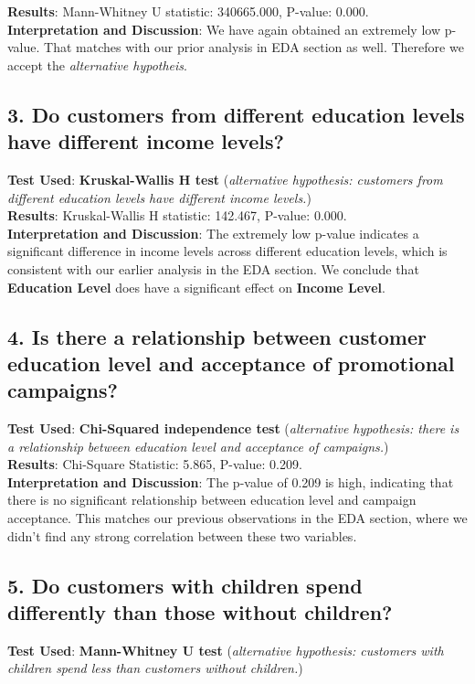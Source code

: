 \documentclass[a4paper,12pt]{article}
\begin{document}
\noindent \textbf{Results}: Mann-Whitney U statistic: 340665.000, P-value: 0.000. \\ 

\noindent \textbf{Interpretation and Discussion}: We have again obtained an extremely low p-value. That matches with our prior analysis in EDA section as well. Therefore we accept the \textit{alternative hypotheis}. \\ 

\subsection*{3. Do customers from different education levels have different income levels?}
\noindent \textbf{Test Used}: \textbf{Kruskal-Wallis H test} (\textit{alternative hypothesis: customers from different education levels have different income levels.})\\ 

\noindent \textbf{Results}: Kruskal-Wallis H statistic: 142.467, P-value: 0.000. \\ 

\noindent \textbf{Interpretation and Discussion}: The extremely low p-value indicates a significant difference in income levels across different education levels, which is consistent with our earlier analysis in the EDA section. We conclude that \textbf{Education Level} does have a significant effect on \textbf{Income Level}.

\subsection*{4. Is there a relationship between customer education level and acceptance of promotional campaigns?}
\noindent \textbf{Test Used}: \textbf{Chi-Squared independence test} (\textit{alternative hypothesis: there is a relationship between education level and acceptance of campaigns.})\\ 

\noindent \textbf{Results}: Chi-Square Statistic: 5.865, P-value: 0.209. \\ 

\noindent \textbf{Interpretation and Discussion}: The p-value of 0.209 is high, indicating that there is no significant relationship between education level and campaign acceptance. This matches our previous observations in the EDA section, where we didn’t find any strong correlation between these two variables.

\subsection*{5. Do customers with children spend differently than those without children?}
\noindent \textbf{Test Used}: \textbf{Mann-Whitney U test} (\textit{alternative hypothesis: customers with children spend less than customers without children.})\\ 
\end{document}
